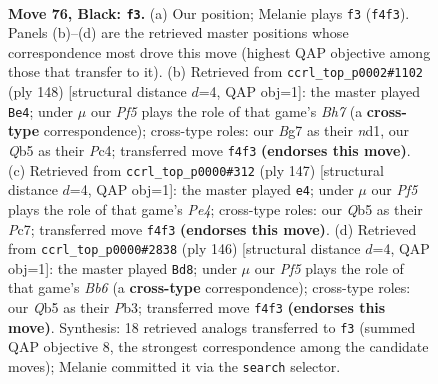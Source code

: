 \documentclass[11pt]{article}
\begin{document}
\clearpage

\begin{figure}[p]\centering
\begin{subfigure}{0.46\textwidth}\centering
\resizebox{\linewidth}{!}{%
\newchessgame
\chessboard[
  setfen={8/2k3b1/8/1q6/5p2/7K/8/8 b - - 1 76},
  showmover=false,
  pgfstyle=straightmove, color=movearrow, markmove={f4-f3}
]}
\caption{}
\end{subfigure}\hfill
\begin{subfigure}{0.46\textwidth}\centering
\resizebox{\linewidth}{!}{%
\newchessgame
\chessboard[
  setfen={8/7B/5k2/2p5/2P4K/8/8/3n4 w - - 1 75},
  showmover=false,
  pgfstyle=straightmove, color=movearrow, markmove={h7-e4}
]}
\caption{}
\end{subfigure}
\\[4pt]
\begin{subfigure}{0.46\textwidth}\centering
\resizebox{\linewidth}{!}{%
\newchessgame
\chessboard[
  setfen={8/b1p5/8/4p3/B7/2K2k2/8/8 b - - 1 74},
  showmover=false,
  pgfstyle=straightmove, color=movearrow, markmove={e5-e4}
]}
\caption{}
\end{subfigure}\hfill
\begin{subfigure}{0.46\textwidth}\centering
\resizebox{\linewidth}{!}{%
\newchessgame
\chessboard[
  setfen={6K1/8/1B1k4/8/1p6/1P6/8/1b6 w - - 3 74},
  showmover=false,
  pgfstyle=straightmove, color=movearrow, markmove={b6-d8}
]}
\caption{}
\end{subfigure}
\caption{\textbf{Move 76, Black: \texttt{f3}.} (a) Our position; Melanie plays \texttt{f3} (\texttt{f4f3}). Panels (b)--(d) are the retrieved master positions whose correspondence most drove this move (highest QAP objective among those that transfer to it). (b) Retrieved from \texttt{ccrl\_top\_p0002\#1102} (ply 148) [structural distance $d$=4, QAP obj=1]: the master played \texttt{Be4}; under $\mu$ our \emph{Pf5} plays the role of that game's \emph{Bh7} (a \textbf{cross-type} correspondence); cross-type roles: our \emph{B}g7 as their \emph{n}d1, our \emph{Q}b5 as their \emph{P}c4; transferred move \texttt{f4f3} \textbf{(endorses this move)}. (c) Retrieved from \texttt{ccrl\_top\_p0000\#312} (ply 147) [structural distance $d$=4, QAP obj=1]: the master played \texttt{e4}; under $\mu$ our \emph{Pf5} plays the role of that game's \emph{Pe4}; cross-type roles: our \emph{Q}b5 as their \emph{P}c7; transferred move \texttt{f4f3} \textbf{(endorses this move)}. (d) Retrieved from \texttt{ccrl\_top\_p0000\#2838} (ply 146) [structural distance $d$=4, QAP obj=1]: the master played \texttt{Bd8}; under $\mu$ our \emph{Pf5} plays the role of that game's \emph{Bb6} (a \textbf{cross-type} correspondence); cross-type roles: our \emph{Q}b5 as their \emph{P}b3; transferred move \texttt{f4f3} \textbf{(endorses this move)}. Synthesis: 18 retrieved analogs transferred to \texttt{f3} (summed QAP objective 8, the strongest correspondence among the candidate moves); Melanie committed it via the \texttt{search} selector.}
\label{fig:thought-m151}
\end{figure}
\end{document}
